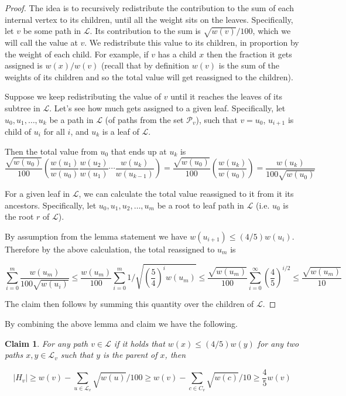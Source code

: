 \documentclass[11pt]{article}
\newtheorem{claim}[theorem]{Claim}
\theoremstyle{definition}
\newcommand{\pth}[2][\!]{#1\left({#2}\right)}
\begin{document}
\begin{proof}
The idea is to recursively redistribute the contribution to the sum of each internal vertex to its children, 
until all the weight sits on the leaves.  Specifically, let $v$ be some path in $\mathcal{L}$.  Its 
contribution to the sum is $\sqrt{w(v)}/100$, which we will call the value at $v$.  We redistribute this 
value to its children, in proportion by the weight of each child.  For example, if $v$ has a child $x$ then 
the fraction it gets assigned is $w(x)/w(v)$ (recall that by definition $w(v)$ is the sum of the weights of 
its children and so the total value will get reassigned to the children).

Suppose we keep redistributing the value of $v$ until it reaches the leaves of its subtree in $\mathcal{L}$.  
Let's see how much gets assigned to a given leaf.  Specifically, let $u_0, u_1, \ldots, u_k$ 
be a path in $\mathcal{L}$ (of paths from the set $\mathcal{P}_v$), such that $v=u_0$, $u_{i+1}$ 
is child of $u_i$ for all $i$, and $u_k$ is a leaf of $\mathcal{L}$.  

Then the total value from $u_0$ that ends up at $u_k$ is 
\[
\frac{\sqrt{w(u_0)}}{100} \pth{ \frac{w(u_1)}{w(u_0)} \frac{w(u_2)}{w(u_1)} \cdots \frac{w(u_k)}{w(u_{k-1})} }
= \frac{\sqrt{w(u_0)}}{100} \pth{ \frac{w(u_k)}{w(u_0)} } = \frac{w(u_k)}{100\sqrt{w(u_0)}}
\]

For a given leaf in $\mathcal{L}$, we can calculate the total value reassigned to it from it its ancestors.
Specifically, let $u_0, u_1, u_2, \dots, u_m$ be a root to leaf path in $\mathcal{L}$ 
(i.e. $u_0$ is the root $r$ of $\mathcal{L}$).

By assumption from the lemma statement we have $w(u_{i+1})\leq (4/5) w(u_i)$.  Therefore by the above calculation, 
the total reassigned to $u_m$ is 

\[
 \sum_{i=0}^m \frac{w(u_m)}{100\sqrt{w(u_i)}} \leq \frac{w(u_m)}{100} \sum_{i=0}^m 1 \Big/ \sqrt{\pth{\frac{5}{4}}^iw(u_m)} 
 \leq \frac{\sqrt{w(u_m)}}{100} \sum_{i=0}^{\infty} \pth{\frac{4}{5}}^{i/2} \leq \frac{\sqrt{w(u_m)}}{10}
\]

The claim then follows by summing this quantity over the children of $\mathcal{L}$.
\end{proof}

By combining the above lemma and claim we have the following.

\begin{claim}
For any path $v\in \mathcal{L}$ if it holds that 
$w(x)\leq (4/5) w(y)$ for any two paths $x,y\in \mathcal{L}_v$ such that $y$ is the parent of $x$, then 

\[
|H_v|\geq w(v)-\sum_{u\in \mathcal{L}_v} \sqrt{w(u)}/100 \geq w(v)- \sum_{c\in C_v} \sqrt{w(c)}/10 \geq \frac{4}{5} w(v)
\]
\end{claim}
\end{document}
